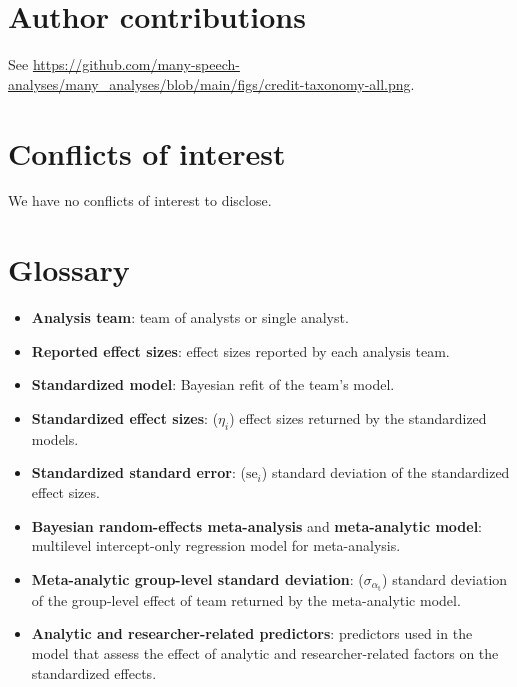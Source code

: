 \documentclass[Review,times,sageh]{sagej}
\providecommand{\tightlist}{\setlength{\itemsep}{0pt}\setlength{\parskip}{0pt}}
\begin{document}
\hypertarget{author-contributions}{%
\section{Author contributions}\label{author-contributions}}

See \url{https://github.com/many-speech-analyses/many_analyses/blob/main/figs/credit-taxonomy-all.png}.

\hypertarget{conflicts-of-interest}{%
\section{Conflicts of interest}\label{conflicts-of-interest}}

We have no conflicts of interest to disclose.

\appendix

\hypertarget{glossary}{%
\section{Glossary}\label{glossary}}

\begin{itemize}
\tightlist
\item
  \textbf{Analysis team}: team of analysts or single analyst.
\item
  \textbf{Reported effect sizes}: effect sizes reported by each analysis team.
\item
  \textbf{Standardized model}: Bayesian refit of the team's model.
\item
  \textbf{Standardized effect sizes}: (\(\eta_i\)) effect sizes returned by the standardized models.
\item
  \textbf{Standardized standard error}: (\(\text{se}_i\)) standard deviation of the standardized effect sizes.
\item
  \textbf{Bayesian random-effects meta-analysis} and \textbf{meta-analytic model}: multilevel intercept-only regression model for meta-analysis.
\item
  \textbf{Meta-analytic group-level standard deviation}: (\(\sigma_{\alpha_{\text{t}}}\)) standard deviation of the group-level effect of team returned by the meta-analytic model.
\item
  \textbf{Analytic and researcher-related predictors}: predictors used in the model that assess the effect of analytic and researcher-related factors on the standardized effects.
\end{itemize}



\end{document}
